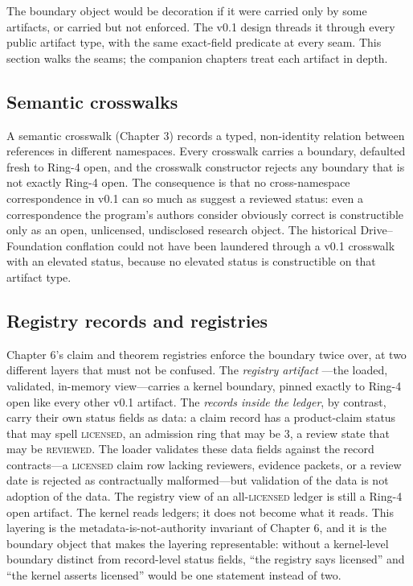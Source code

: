 The boundary object would be decoration if it were carried only by some
artifacts, or carried but not enforced. The v0.1 design threads it through
every public artifact type, with the same exact-field predicate at every
seam. This section walks the seams; the companion chapters treat each
artifact in depth.

\subsection{Semantic crosswalks}

A semantic crosswalk (Chapter 3) records a typed, non-identity relation
between references in different namespaces. Every crosswalk carries a
boundary, defaulted fresh to Ring-4 open, and the crosswalk constructor
rejects any boundary that is not exactly Ring-4 open. The consequence is
that no cross-namespace correspondence in v0.1 can so much as suggest a
reviewed status: even a correspondence the program's authors consider
obviously correct is constructible only as an open, unlicensed,
undisclosed research object. The historical Drive--Foundation conflation
could not have been laundered through a v0.1 crosswalk with an elevated
status, because no elevated status is constructible on that artifact type.

\subsection{Registry records and registries}

Chapter 6's claim and theorem registries enforce the boundary twice over, at
two different layers that must not be confused. The \emph{registry artifact}
---the loaded, validated, in-memory view---carries a kernel boundary, pinned
exactly to Ring-4 open like every other v0.1 artifact. The \emph{records
inside the ledger}, by contrast, carry their own status fields as data:
a claim record has a product-claim status that may spell \textsc{licensed},
an admission ring that may be 3, a review state that may be \textsc{reviewed}.
The loader validates these data fields against the record contracts---a
\textsc{licensed} claim row lacking reviewers, evidence packets, or a review
date is rejected as contractually malformed---but validation of the data is
not adoption of the data. The registry view of an all-\textsc{licensed}
ledger is still a Ring-4 open artifact. The kernel reads ledgers; it does
not become what it reads. This layering is the metadata-is-not-authority
invariant of Chapter 6, and it is the boundary object that makes the
layering representable: without a kernel-level boundary distinct from
record-level status fields, ``the registry says licensed'' and ``the kernel
asserts licensed'' would be one statement instead of two.

